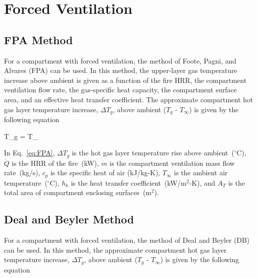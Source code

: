 %
%
%
%


\clearpage


\section{Forced Ventilation}

\subsection{FPA Method}

For a compartment with forced ventilation, the method of Foote, Pagni, and Alvares (FPA) can be used. In this method, the upper-layer gas temperature increase above ambient is given as a function of the fire HRR, the compartment ventilation flow rate, the gas-specific heat capacity, the compartment surface area, and an effective heat transfer coefficient. The approximate compartment hot gas layer temperature increase, $\Delta T_g$, above ambient ($T_g$ - $T_\infty$) is given by the following equation

\be
\Delta T_g =  T_\infty
\label{eq:FPA}
\ee

In Eq.~\ref{eq:FPA}, $\Delta T_g$ is the hot gas layer temperature rise above ambient~($^\circ$C), $\dot Q$ is the HRR of the fire~(kW), $\dot m$ is the compartment ventilation mass flow rate~(kg/s), $c_p$ is the specific heat of air (kJ/kg-K), $T_\infty$ is the ambient air temperature~($^\circ$C), $h_k$ is the heat transfer coefficient~(kW/m$^2$-K), and $A_T$ is the total area of compartment enclosing surfaces~(m$^2$).


\subsection{Deal and Beyler Method}

For a compartment with forced ventilation, the method of Deal and Beyler (DB) can be used. In this method, the approximate compartment hot gas layer temperature increase, $\Delta T_g$, above ambient ($T_g$ - $T_\infty$) is given by the following equation

